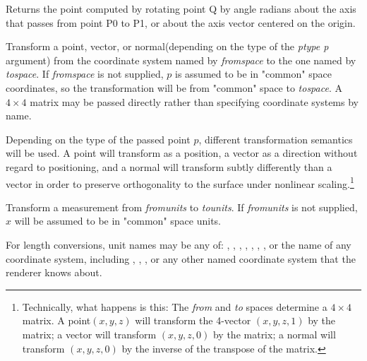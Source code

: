 \documentclass[11pt,letterpaper]{book}
\def\normal{{\cf normal}\xspace}
\def\point{{\cf point}\xspace}
\def\vector{{\cf vector}\xspace}
\def\commonspace{{\cf "common"} space\xspace}
\begin{document}
Returns the point computed by rotating point {\cf Q} by {\cf angle}
radians about the axis that passes from point {\cf P0} to {\cf P1},
or about the {\cf axis} vector centered on the origin.
\apiend


Transform a \point, \vector, or \normal (depending on the type of the
\emph{ptype p} argument) from the coordinate system named by
\emph{fromspace} to the one named by \emph{tospace}.  If 
\emph{fromspace} is not supplied, $p$ is assumed to be in \commonspace
coordinates, so the transformation will be from \commonspace to
\emph{tospace}.  A $4 \times 4$ matrix may be passed directly rather
than specifying coordinate systems by name.

Depending on the type of the passed point $p$, different transformation
semantics will be used.  A \point will transform as a position, a
\vector as a direction without regard to positioning, and a \normal will
transform subtly differently than a \vector in order to preserve
orthogonality to the surface under nonlinear
scaling.\footnote{Technically, what happens is this: The \emph{from} and
  \emph{to} spaces determine a $4 \times 4$ matrix.  A \point $(x,y,z)$
  will transform the 4-vector $(x,y,z,1)$ by the matrix; a \vector will
  transform $(x,y,z,0)$ by the matrix; a \normal will transform
  $(x,y,z,0)$ by the inverse of the transpose of the matrix.}

\apiend



Transform a measurement from \emph{fromunits} to \emph{tounits}.  If
\emph{fromunits} is not supplied, $x$ will be assumed to be in
\commonspace units.

For length conversions, unit names may be any of: , ,
, , , , , or the name of any
coordinate system, including , , , or
any other named coordinate system that the renderer knows about.
\end{document}
